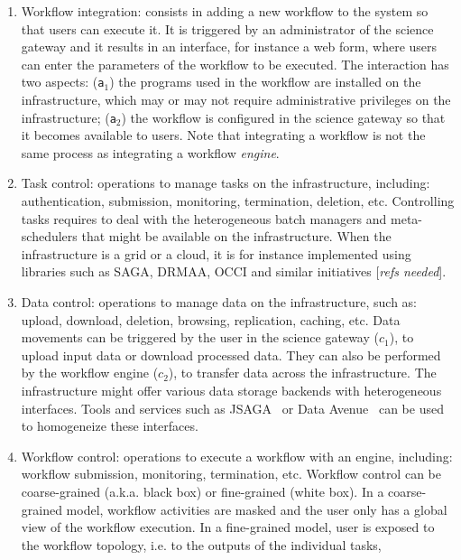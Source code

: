 \documentclass[preprint,3p,twocolumn]{elsarticle}
\newcommand{\todo}[1]{\color{blue}\xspace[\emph{#1}]\xspace\color{black}}
\begin{document}
\begin{enumerate}[leftmargin=0cm,itemindent=0.6cm,label=\texttt{(\alph*)}]

\item Workflow integration: consists in adding a new workflow to the
  system so that users can execute it. It is triggered by an
  administrator of the science gateway and it results in an interface,
  for instance a web form, where users can enter the parameters of the
  workflow to be executed. The interaction has two aspects:
  (\texttt{a$_1$}) the programs used in the workflow are installed on
  the infrastructure, which may or may not require administrative
  privileges on the infrastructure; (\texttt{a$_2$}) the workflow is
  configured in the science gateway so that it becomes available to
  users. Note that integrating a workflow is not the same process as
  integrating a workflow \emph{engine}.
\item Task control: operations to manage tasks on the infrastructure,
  including: authentication, submission, monitoring, termination,
  deletion, etc. Controlling tasks requires to deal with the
  heterogeneous batch managers and meta-schedulers that might be
  available on the infrastructure. When the infrastructure is a grid
  or a cloud, it is for instance implemented using libraries such as
  SAGA, DRMAA, OCCI and similar initiatives \todo{refs needed}.
\item Data control: operations to manage data on the infrastructure,
  such as: upload, download, deletion, browsing, replication, caching,
  etc. Data movements can be triggered by the user in the science
  gateway (\texttt{$c_1$}), to upload input data or download processed
  data. They can also be performed by the workflow engine
  (\texttt{$c_2$}), to transfer data across the infrastructure. The
  infrastructure might offer various data storage backends with
  heterogeneous interfaces. Tools and services such as
  JSAGA~\cite{reynaud2010uniform} or Data Avenue~\cite{hajnal2014data}
  can be used to homogeneize these interfaces.
\item Workflow control: operations to execute a workflow with an
  engine, including: workflow submission, monitoring, termination,
  etc. Workflow control can be coarse-grained (a.k.a. black box) or
  fine-grained (white box). In a coarse-grained model, workflow
  activities are masked and the user only has a global view of the
  workflow execution. In a fine-grained model, user is exposed to the
  workflow topology, i.e. to the outputs of the individual tasks,

\end{enumerate}
\end{document}
